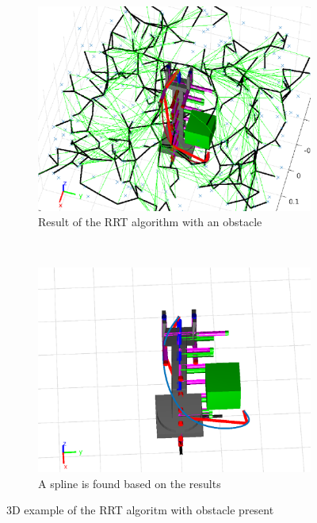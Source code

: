 \def\picsSiz{1.08}
\begin{figure}[htbp]
    \centering
    \begin{subfigure}[htbp]{0.45\textwidth}
        \centering
        \includegraphics[width = \picsSiz\linewidth]{img/rrt3dOBav.eps}
        \caption{Result of the RRT algorithm with an obstacle}
        \label{fig:obav1}
    \end{subfigure}
    ~ 
    \begin{subfigure}[htbp]{0.45\textwidth}
        \centering
        \includegraphics[width = \picsSiz\linewidth]{img/rrt3dOBavPath.eps}
        \caption{A spline is found based on the results}
        \label{fig:obav2}
    \end{subfigure}
    \caption{3D example of the RRT algoritm with obstacle present}
    \label{fig:obav}
\end{figure}

